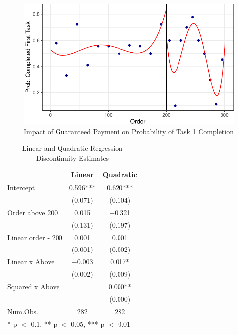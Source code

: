 \documentclass[
  letterpaper,
  DIV=11,
  numbers=noendperiod]{scrartcl}
\begin{document}
\begin{figure}

{\centering \includegraphics{The-Sources-of-Researcher-Variation-in-Economics_files/figure-pdf/fig-rdd-1.pdf}

}

\caption{\label{fig-rdd}Impact of Guaranteed Payment on Probability of
Task 1 Completion}

\end{figure}

\begin{table}
\centering
\caption{Linear and Quadratic Regression Discontinuity Estimates\label{tab-rdd-reg}}
\centering
\begin{tabular}[t]{lcc}
\toprule
  & Linear & Quadratic\\
\midrule
Intercept & \num{0.596}*** & \num{0.620}***\\
 & (\num{0.071}) & (\num{0.104})\\
Order above 200 & \num{0.015} & \num{-0.321}\\
 & (\num{0.131}) & (\num{0.197})\\
Linear order - 200 & \num{0.001} & \num{0.001}\\
 & (\num{0.001}) & (\num{0.002})\\
Linear x Above & \num{-0.003} & \num{0.017}*\\
 & (\num{0.002}) & (\num{0.009})\\
Squared x Above &  & \num{0.000}**\\
 &  & (\num{0.000})\\
\midrule
Num.Obs. & \num{282} & \num{282}\\
\bottomrule
\multicolumn{3}{l}{\rule{0pt}{1em}* p $<$ 0.1, ** p $<$ 0.05, *** p $<$ 0.01}\\
\end{tabular}
\end{table}
\end{document}
